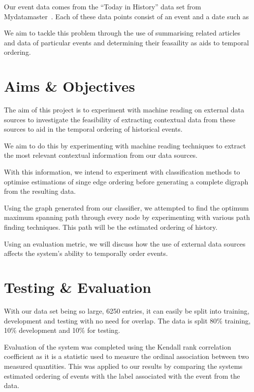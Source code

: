 \documentclass[bsc,frontabs,twoside,singlespacing,parskip,deptreport]{infthesis}     %
\begin{document}
Our event data comes from the ``Today in History'' data set from Mydatamaster~\cite{mydatamaster}. Each of these data points consist
of an event and a date such as
\begin{equation}
  [ \text{``Alaska becomes 49th State''}, \text{``1959-01-01''} ]\nonumber
\end{equation}


We aim to tackle this problem through the use of summarising related articles and data of particular
events and determining their feasaility as aids to temporal ordering. 

\section{Aims \& Objectives}
The aim of this project is to experiment with machine reading on external data sources to
investigate the feasibility of extracting contextual data from these sources to aid in the
temporal ordering of historical events.

We aim to do this by experimenting with machine reading techniques to extract the most
relevant contextual information from our data sources.

With this information, we intend to experiment with classification methods to optimise estimations
of singe edge ordering before generating a complete digraph from the resulting data.

Using the graph generated from our classifier, we attempted to find the optimum maximum spanning path
through every node by experimenting with various path finding techniques.
This path will be the estimated ordering of history.


Using an evaluation metric, we will discuss how the use of external data sources affects the system's ability to
temporally order events.

\section{Testing \& Evaluation}
With our data set being so large, 6250 entries, it can
easily be split into training, development and testing with no
need for overlap. The data is split 80\% training,
10\% development and 10\% for testing.

Evaluation of the system was completed using the
Kendall rank correlation coefficient as it is a statistic
used to measure the ordinal association between two
measured quantities. This was applied to our results
by comparing the systems estimated ordering of events
with the label associated with the event from the data.
\end{document}

